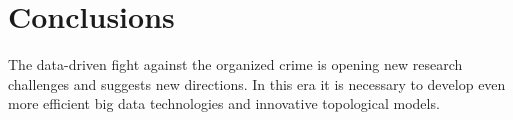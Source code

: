 \section{Conclusions}
\label{sec:conclusions}

The data-driven fight against the organized crime is opening new research challenges and suggests new directions. 
In this era it is necessary to develop even more efficient big data technologies and innovative topological models.